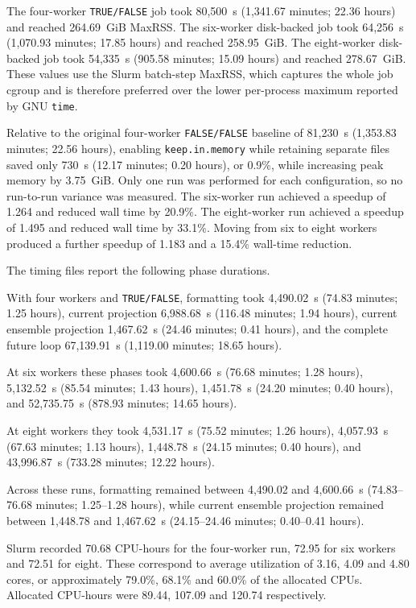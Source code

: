 The four-worker \texttt{TRUE/FALSE} job took 80,500~s (1,341.67 minutes; 22.36 hours) and reached 264.69~GiB MaxRSS. The six-worker disk-backed job took 64,256~s (1,070.93 minutes; 17.85 hours) and reached 258.95~GiB. The eight-worker disk-backed job took 54,335~s (905.58 minutes; 15.09 hours) and reached 278.67~GiB. These values use the Slurm batch-step MaxRSS, which captures the whole job cgroup and is therefore preferred over the lower per-process maximum reported by GNU \texttt{time}.

Relative to the original four-worker \texttt{FALSE/FALSE} baseline of 81,230~s (1,353.83 minutes; 22.56 hours), enabling \texttt{keep.in.memory} while retaining separate files saved only 730~s (12.17 minutes; 0.20 hours), or 0.9\%, while increasing peak memory by 3.75~GiB. Only one run was performed for each configuration, so no run-to-run variance was measured. The six-worker run achieved a speedup of 1.264 and reduced wall time by 20.9\%. The eight-worker run achieved a speedup of 1.495 and reduced wall time by 33.1\%. Moving from six to eight workers produced a further speedup of 1.183 and a 15.4\% wall-time reduction.

The timing files report the following phase durations.

With four workers and \texttt{TRUE/FALSE}, formatting took 4,490.02~s (74.83 minutes; 1.25 hours), current projection 6,988.68~s (116.48 minutes; 1.94 hours), current ensemble projection 1,467.62~s (24.46 minutes; 0.41 hours), and the complete future loop 67,139.91~s (1,119.00 minutes; 18.65 hours).

At six workers these phases took 4,600.66~s (76.68 minutes; 1.28 hours), 5,132.52~s (85.54 minutes; 1.43 hours), 1,451.78~s (24.20 minutes; 0.40 hours), and 52,735.75~s (878.93 minutes; 14.65 hours).

At eight workers they took 4,531.17~s (75.52 minutes; 1.26 hours), 4,057.93~s (67.63 minutes; 1.13 hours), 1,448.78~s (24.15 minutes; 0.40 hours), and 43,996.87~s (733.28 minutes; 12.22 hours).

Across these runs, formatting remained between 4,490.02 and 4,600.66~s (74.83--76.68 minutes; 1.25--1.28 hours), while current ensemble projection remained between 1,448.78 and 1,467.62~s (24.15--24.46 minutes; 0.40--0.41 hours).

Slurm recorded 70.68 CPU-hours for the four-worker run, 72.95 for six workers and 72.51 for eight. These correspond to average utilization of 3.16, 4.09 and 4.80 cores, or approximately 79.0\%, 68.1\% and 60.0\% of the allocated CPUs. Allocated CPU-hours were 89.44, 107.09 and 120.74 respectively.

